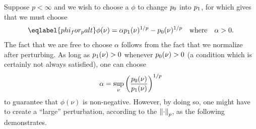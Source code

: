 Suppose $p < \infty$ and we wish to choose a $\phi$ to change $p_{0}$ into
$p_{1}$, for which  gives that we must choose
%
\begin{align}\eqlabel{phi_for_palt}
%
\phi(\nu) = \alpha \palt(\nu)^{1/p} - \pbase(\nu)^{1/p}
    \mathtxt{where}\alpha > 0.
%
\end{align}
%
The fact that we are free to choose $\alpha$ follows from the fact that we
normalize after perturbing.  As long as $p_{1}(\nu) > 0$ whenever $p_{0}(\nu) >
0$ (a condition which is certainly not always satisfied), one can choose
%
\begin{align*}
%
\alpha = \sup_{\nu} \left(\frac{\pbase(\nu)}{\palt(\nu)}\right)^{1/p}
%
\end{align*}
%
to guarantee that $\phi(\nu)$ is non-negative.  However, by doing so, one might
have to create a ``large'' perturbation, according to the $\left\Vert\cdot\right\Vert_p$,
as the following  demonstrates.



